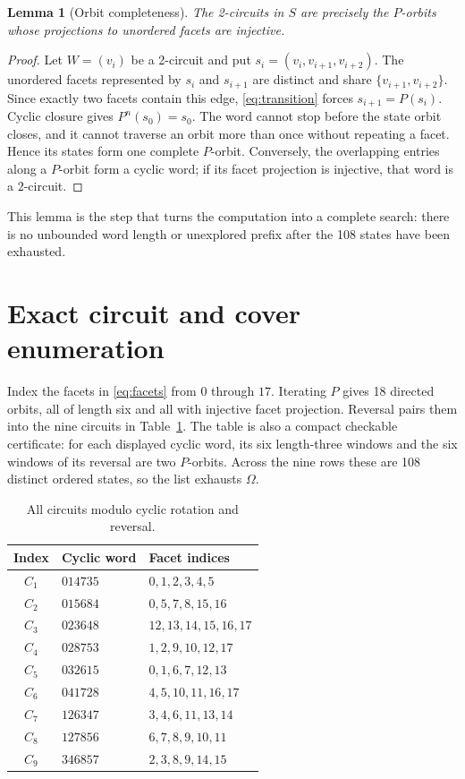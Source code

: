 \documentclass[11pt]{article}
\newtheorem{lemma}[theorem]{Lemma}
\begin{document}
\begin{lemma}[Orbit completeness]\label{lem:complete}
The 2-circuits in $S$ are precisely the $P$-orbits whose projections to
unordered facets are injective.
\end{lemma}

\begin{proof}
Let $W=(v_i)$ be a 2-circuit and put
$s_i=(v_i,v_{i+1},v_{i+2})$.  The unordered facets represented by $s_i$ and
$s_{i+1}$ are distinct and share $\{v_{i+1},v_{i+2}\}$.  Since exactly two
facets contain this edge, \eqref{eq:transition} forces
$s_{i+1}=P(s_i)$.  Cyclic closure gives $P^n(s_0)=s_0$.  The word cannot stop
before the state orbit closes, and it cannot traverse an orbit more than once
without repeating a facet.  Hence its states form one complete $P$-orbit.
Conversely, the overlapping entries along a $P$-orbit form a cyclic word; if
its facet projection is injective, that word is a 2-circuit.
\end{proof}

This lemma is the step that turns the computation into a complete search:
there is no unbounded word length or unexplored prefix after the 108 states
have been exhausted.

\section{Exact circuit and cover enumeration}

Index the facets in \eqref{eq:facets} from $0$ through $17$.  Iterating $P$
gives 18 directed orbits, all of length six and all with injective facet
projection.  Reversal pairs them into the nine circuits in
Table~\ref{tab:circuits}.  The table is also a compact checkable certificate:
for each displayed cyclic word, its six length-three windows and the six
windows of its reversal are two $P$-orbits.  Across the nine rows these are
108 distinct ordered states, so the list exhausts $\Omega$.

\begin{table}[ht]
\centering
\caption{All circuits modulo cyclic rotation and reversal.}
\label{tab:circuits}
\begin{tabular}{@{}cll@{}}
\toprule
Index & Cyclic word & Facet indices \\
\midrule
$C_1$ & $014735$ & $0,1,2,3,4,5$ \\
$C_2$ & $015684$ & $0,5,7,8,15,16$ \\
$C_3$ & $023648$ & $12,13,14,15,16,17$ \\
$C_4$ & $028753$ & $1,2,9,10,12,17$ \\
$C_5$ & $032615$ & $0,1,6,7,12,13$ \\
$C_6$ & $041728$ & $4,5,10,11,16,17$ \\
$C_7$ & $126347$ & $3,4,6,11,13,14$ \\
$C_8$ & $127856$ & $6,7,8,9,10,11$ \\
$C_9$ & $346857$ & $2,3,8,9,14,15$ \\
\bottomrule
\end{tabular}
\end{table}
\end{document}
